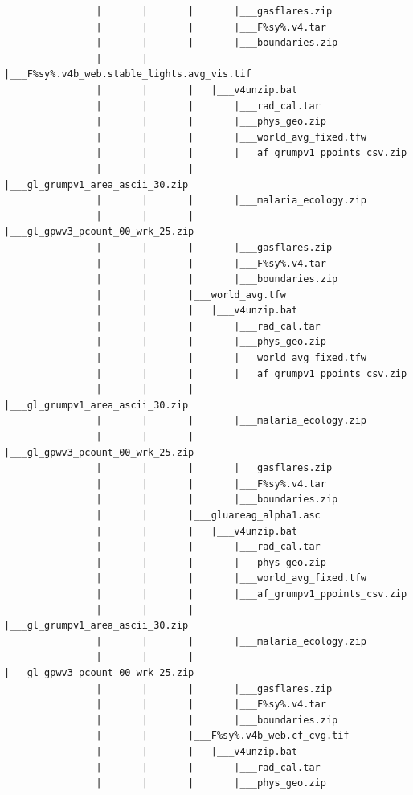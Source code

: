 \documentclass[]{book}
\begin{document}
\begin{verbatim}
                |       |       |       |___gasflares.zip
                |       |       |       |___F%sy%.v4.tar
                |       |       |       |___boundaries.zip
                |       |       |___F%sy%.v4b_web.stable_lights.avg_vis.tif
                |       |       |   |___v4unzip.bat
                |       |       |       |___rad_cal.tar
                |       |       |       |___phys_geo.zip
                |       |       |       |___world_avg_fixed.tfw
                |       |       |       |___af_grumpv1_ppoints_csv.zip
                |       |       |       |___gl_grumpv1_area_ascii_30.zip
                |       |       |       |___malaria_ecology.zip
                |       |       |       |___gl_gpwv3_pcount_00_wrk_25.zip
                |       |       |       |___gasflares.zip
                |       |       |       |___F%sy%.v4.tar
                |       |       |       |___boundaries.zip
                |       |       |___world_avg.tfw
                |       |       |   |___v4unzip.bat
                |       |       |       |___rad_cal.tar
                |       |       |       |___phys_geo.zip
                |       |       |       |___world_avg_fixed.tfw
                |       |       |       |___af_grumpv1_ppoints_csv.zip
                |       |       |       |___gl_grumpv1_area_ascii_30.zip
                |       |       |       |___malaria_ecology.zip
                |       |       |       |___gl_gpwv3_pcount_00_wrk_25.zip
                |       |       |       |___gasflares.zip
                |       |       |       |___F%sy%.v4.tar
                |       |       |       |___boundaries.zip
                |       |       |___gluareag_alpha1.asc
                |       |       |   |___v4unzip.bat
                |       |       |       |___rad_cal.tar
                |       |       |       |___phys_geo.zip
                |       |       |       |___world_avg_fixed.tfw
                |       |       |       |___af_grumpv1_ppoints_csv.zip
                |       |       |       |___gl_grumpv1_area_ascii_30.zip
                |       |       |       |___malaria_ecology.zip
                |       |       |       |___gl_gpwv3_pcount_00_wrk_25.zip
                |       |       |       |___gasflares.zip
                |       |       |       |___F%sy%.v4.tar
                |       |       |       |___boundaries.zip
                |       |       |___F%sy%.v4b_web.cf_cvg.tif
                |       |       |   |___v4unzip.bat
                |       |       |       |___rad_cal.tar
                |       |       |       |___phys_geo.zip

\end{verbatim}
\end{document}
